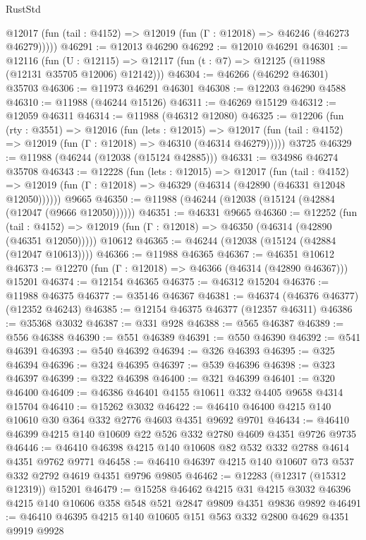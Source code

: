 \begin{lexlean}{RustStd}
\begin{coremodule}
      @12017 (fun (tail : @4152) => @12019 (fun (Γ : @12018) => @46246 (@46273 @46279)))))
@46291 := @12013 @46290
@46292 := @12010 @46291
@46301 := @12116
    (fun (U : @12115) => @12117 (fun (t : @7) => @12125 (@11988 (@12131 @35705 @12006) @12142)))
@46304 := @46266 (@46292 @46301) @35703
@46306 := @11973 @46291 @46301
@46308 := @12203 @46290 @4588
@46310 := @11988 (@46244 @15126)
@46311 := @46269 @15129
@46312 := @12059 @46311
@46314 := @11988 (@46312 @12080)
@46325 := @12206
    (fun (rty : @3551) =>
    @12016
      (fun (lets : @12015) =>
      @12017 (fun (tail : @4152) => @12019 (fun (Γ : @12018) => @46310 (@46314 @46279)))))
    @3725
@46329 := @11988 (@46244 (@12038 (@15124 @42885)))
@46331 := @34986 @46274 @35708
@46343 := @12228
    (fun (lets : @12015) =>
    @12017
      (fun (tail : @4152) =>
      @12019 (fun (Γ : @12018) => @46329 (@46314 (@42890 (@46331 @12048 @12050))))))
    @9665
@46350 := @11988 (@46244 (@12038 (@15124 (@42884 (@12047 (@9666 @12050))))))
@46351 := @46331 @9665
@46360 := @12252
    (fun (tail : @4152) => @12019 (fun (Γ : @12018) => @46350 (@46314 (@42890 (@46351 @12050)))))
    @10612
@46365 := @46244 (@12038 (@15124 (@42884 (@12047 @10613))))
@46366 := @11988 @46365
@46367 := @46351 @10612
@46373 := @12270 (fun (Γ : @12018) => @46366 (@46314 (@42890 @46367))) @15201
@46374 := @12154 @46365
@46375 := @46312 @15204
@46376 := @11988 @46375
@46377 := @35146 @46367
@46381 := @46374 (@46376 @46377) (@12352 @46243)
@46385 := @12154 @46375 @46377 (@12357 @46311)
@46386 := @35368 @3032
@46387 := @331 @928
@46388 := @565 @46387
@46389 := @556 @46388
@46390 := @551 @46389
@46391 := @550 @46390
@46392 := @541 @46391
@46393 := @540 @46392
@46394 := @326 @46393
@46395 := @325 @46394
@46396 := @324 @46395
@46397 := @539 @46396
@46398 := @323 @46397
@46399 := @322 @46398
@46400 := @321 @46399
@46401 := @320 @46400
@46409 := @46386 @46401 @4155 @10611 @332 @4405 @9658 @4314 @15704
@46410 := @15262 @3032
@46422 := @46410 @46400 @4215 @140 @10610 @30 @364 @332 @2776 @4603 @4351 @9692 @9701
@46434 := @46410 @46399 @4215 @140 @10609 @22 @526 @332 @2780 @4609 @4351 @9726 @9735
@46446 := @46410 @46398 @4215 @140 @10608 @82 @532 @332 @2788 @4614 @4351 @9762 @9771
@46458 := @46410 @46397 @4215 @140 @10607 @73 @537 @332 @2792 @4619 @4351 @9796 @9805
@46462 := @12283 (@12317 (@15312 @12319)) @15201
@46479 := @15258
    @46462
    @4215
    @31
    @4215
    @3032
    @46396
    @4215
    @140
    @10606
    @358
    @548
    @521
    @2847
    @9809
    @4351
    @9836
    @9892
@46491 := @46410 @46395 @4215 @140 @10605 @151 @563 @332 @2800 @4629 @4351 @9919 @9928

\end{coremodule}
\end{lexlean}
